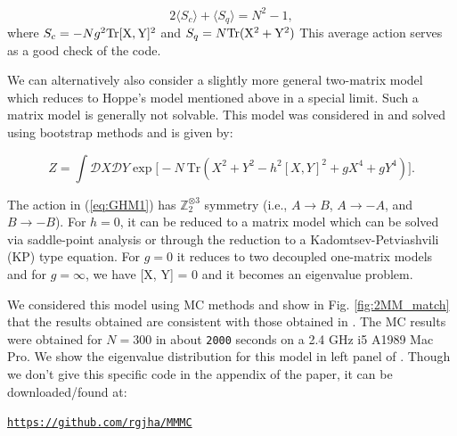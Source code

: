 \documentclass[11pt]{article}
\begin{document}
\begin{equation}
	2 \langle S_{c} \rangle + \langle S_{q}  \rangle = N^2 - 1, 
\end{equation}
where $ S_{c} = -Ng^2 \rm{Tr}[X,Y]^2$  and 
$ S_{q} = N \rm{Tr} (X^2 + Y^2) $
This average action serves as a good check of the code. 

We can alternatively also consider a slightly more general two-matrix model which reduces to 
Hoppe's model mentioned above in a special limit. Such a matrix model is generally not solvable. 
This model was considered in \cite{Kazakov:2021lel} and solved using bootstrap methods
and is given by:

\begin{equation}
\label{eq:GHM1} 
Z = \int \mathcal{D}X \mathcal{D}Y \exp \Big[-N ~ \mbox{Tr} (X^2 + Y^2 - h^2 [X,Y]^2 + gX^4 + gY^4) \Big].	
\end{equation} 

The action in (\ref{eq:GHM1}) has $\mathbb{Z}_{2}^{\otimes 3}$ symmetry 
(i.e., $A \to B$, $A \to -A$, and $B \to -B$). For $h = 0$, it can be reduced to a
matrix model which can be solved via saddle-point analysis or through the reduction 
to a Kadomtsev-Petviashvili (KP) type equation. 
For $g = 0$ it reduces to two decoupled one-matrix models 
and for $g = \infty$, we have [X, Y] = 0 and it becomes an eigenvalue problem. 


We considered this model using MC methods and show in Fig. \ref{fig:2MM_match} that the results 
obtained are consistent with those obtained in \cite{Kazakov:2021lel}. The MC 
results were obtained for $N = 300$ in about \texttt{2000} seconds on a 2.4 GHz i5 A1989 Mac Pro. 
We show the eigenvalue distribution for this model in left panel of \label{fig:2MM_match1}. 
Though we don't give this specific code in the appendix of the 
paper, it can be downloaded/found at: 
\begin{center} \texttt{\href{https://github.com/rgjha/MMMC}{https://github.com/rgjha/MMMC}} \end{center}
\end{document}
